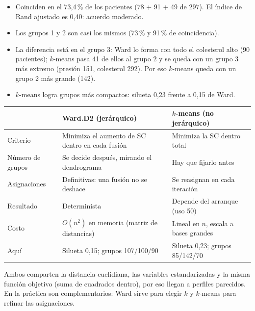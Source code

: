 \begin{itemize}[leftmargin=1.2em]
  \item[\color{cTeal}\faCheck] Coinciden en el 73,4\,\% de los pacientes (78 + 91 + 49 de 297). El índice de
  Rand ajustado es 0,40: acuerdo moderado.
  \item[\color{cTeal}\faCheck] Los grupos 1 y 2 son casi los mismos (73\,\% y 91\,\% de coincidencia).
  \item[\color{cRed}\faIcon{exchange-alt}] La diferencia está en el grupo 3: Ward lo forma con todo el colesterol
  alto (90 pacientes); $k$-means pasa 41 de ellos al grupo 2 y se queda con
  un grupo 3 más extremo (presión 151, colesterol 292). Por eso $k$-means queda con un grupo 2 más grande (142).
  \item[\color{cTeal}\faBalanceScale] $k$-means logra grupos más compactos: silueta 0,23 frente a 0,15 de Ward.
\end{itemize}

\begin{center}\small
\begin{tabular}{p{3.3cm}p{5.4cm}p{5.4cm}}
\toprule
& \textbf{Ward.D2 (jerárquico)} & \textbf{$k$-means (no jerárquico)} \\ \midrule
Criterio & Minimiza el aumento de SC dentro en cada fusión & Minimiza la SC dentro total \\
Número de grupos & Se decide después, mirando el dendrograma & Hay que fijarlo antes \\
Asignaciones & Definitivas: una fusión no se deshace & Se reasignan en cada iteración \\
Resultado & Determinista & Depende del arranque (uso 50) \\
Costo & $O(n^2)$ en memoria (matriz de distancias) & Lineal en $n$, escala a bases grandes \\
Aquí & Silueta 0,15; grupos 107/100/90 & Silueta 0,23; grupos 85/142/70 \\ \bottomrule
\end{tabular}
\end{center}
Ambos comparten la distancia euclidiana, las variables estandarizadas y la misma función objetivo (suma de
cuadrados dentro), por eso llegan a perfiles parecidos. En la práctica son complementarios: Ward sirve para
elegir $k$ y $k$-means para refinar las asignaciones.

